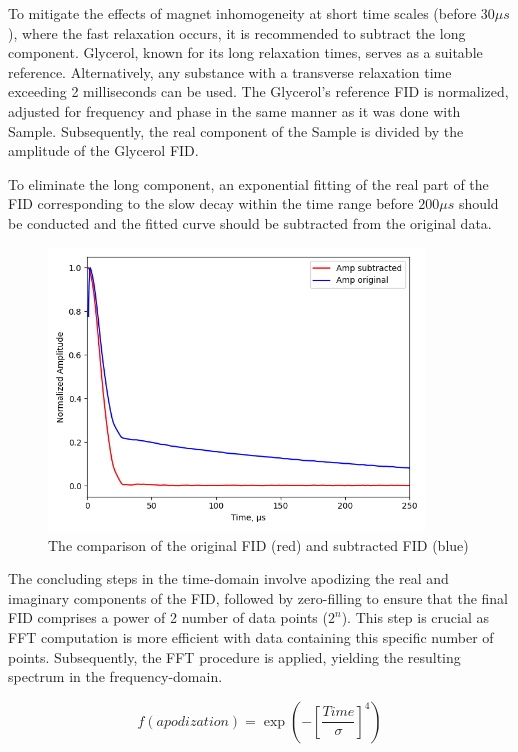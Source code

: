 \documentclass[a4paper,12pt]{article}
\begin{document}
To mitigate the effects of magnet inhomogeneity at short time scales (before $30 \mu s$), where the fast relaxation occurs, it is recommended to subtract the long component. 
Glycerol, known for its long relaxation times, serves as a suitable reference. 
Alternatively, any substance with a transverse relaxation time exceeding 2 milliseconds can be used. 
The Glycerol's reference FID is normalized, adjusted for frequency and phase in the same manner as it was done with Sample. 
Subsequently, the real component of the Sample is divided by the amplitude of the Glycerol FID.

To eliminate the long component, an exponential fitting of the real part of the FID corresponding to the slow decay within the time range before $200 \mu s$ should be conducted and the fitted curve should be subtracted from the original data.

\begin{figure}[H]
  \centering
  \includegraphics[width=10cm]{images/Subtracted_FID.png}
  \caption{The comparison of the original FID (red) and subtracted FID (blue)}
  \label{fig:Subtracted_FID}
\end{figure}

The concluding steps in the time-domain involve apodizing the real and imaginary components of the FID, followed by zero-filling to ensure that the final FID comprises a power of 2 number of data points ($2^n$). 
This step is crucial as FFT computation is more efficient with data containing this specific number of points. 
Subsequently, the FFT procedure is applied, yielding the resulting spectrum in the frequency-domain.

\begin{equation}
  \label{eq:apodization}
  f(apodization) = \exp\left(-\left[\frac{Time}{\sigma}\right]^4\right)
\end{equation}
\end{document}
